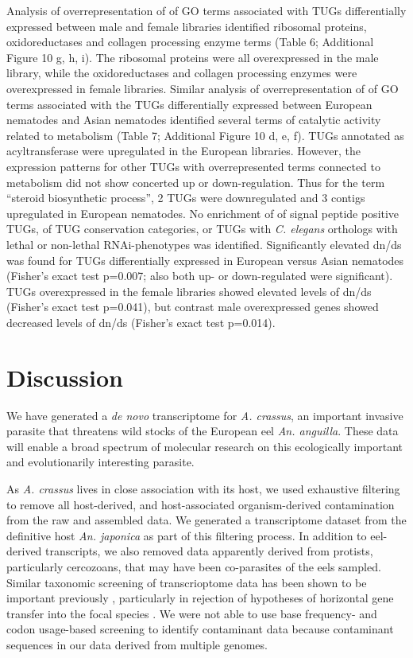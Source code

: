 \documentclass[10pt]{bmc_article}
\newenvironment{bmcformat}{\begin{raggedright}\baselineskip20pt\sloppy\setboolean{publ}{false}}{\end{raggedright}\baselineskip20pt\sloppy}
\begin{document}
\begin{bmcformat}
Analysis of overrepresentation of of GO terms associated with TUGs
differentially expressed between male and female libraries identified
ribosomal proteins, oxidoreductases and collagen processing enzyme
terms (Table 6; Additional Figure 10 g, h, i). The ribosomal proteins were
all overexpressed in the male library, while the oxidoreductases and
collagen processing enzymes were overexpressed in female
libraries. Similar analysis of overrepresentation of of GO terms
associated with the TUGs differentially expressed between European
nematodes and Asian nematodes identified several terms of catalytic
activity related to metabolism (Table 7; Additional Figure 10
d, e, f). TUGs annotated as acyltransferase were upregulated in the
European libraries. However, the expression patterns for other TUGs
with overrepresented terms connected to metabolism did not show
concerted up or down-regulation. Thus for the term ``steroid
biosynthetic process'', 2 TUGs were downregulated and 3 contigs
upregulated in European nematodes. No enrichment of of signal peptide
positive TUGs, of TUG conservation categories, or TUGs with
\textit{C. elegans} orthologs with lethal or non-lethal
RNAi-phenotypes was identified. Significantly elevated dn/ds was found
for TUGs differentially expressed in European versus Asian nematodes
(Fisher's exact test p=0.007; also both up- or down-regulated were
significant). TUGs overexpressed in the female libraries showed
elevated levels of dn/ds (Fisher's exact test p=0.041), but contrast
male overexpressed genes showed decreased levels of dn/ds (Fisher's
exact test p=0.014).


\section*{Discussion}

We have generated a \textit{de novo} transcriptome for
\textit{A. crassus}, an important invasive parasite that threatens wild
stocks of the European eel \textit{An. anguilla}. These data will
enable a broad spectrum of molecular research on this ecologically
important and evolutionarily interesting parasite. 

As \textit{A. crassus} lives in close association with its host, we
used exhaustive filtering to remove all host-derived, and
host-associated organism-derived contamination from the raw and
assembled data. We generated a transcriptome dataset from the
definitive host \textit{An. japonica} as part of this filtering
process. In addition to eel-derived transcripts, we also removed data
apparently derived from protists, particularly cercozoans, that may
have been co-parasites of the eels sampled. Similar taxonomic
screening of transcrioptome data has been shown to be important
previously \cite{pmid21138572}, particularly in rejection of
hypotheses of horizontal gene transfer into the focal species
\cite{pmid20386959}. We were not able to use base frequency- and codon
usage-based screening to identify contaminant data \cite{pmid20034392,
  pmid17218127} because contaminant sequences in our data derived from
multiple genomes.



\end{bmcformat}
\end{document}
